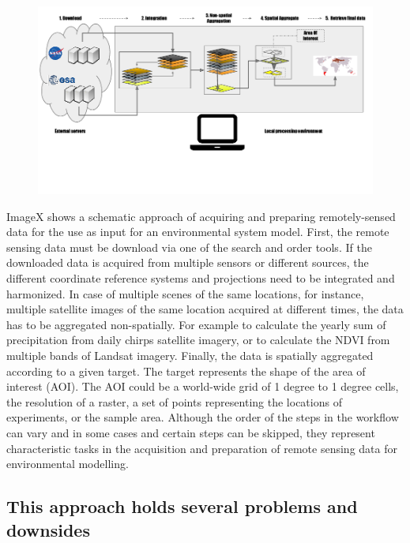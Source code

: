 \documentclass[11pt,twoside,a4paper,final]{report}
\begin{document}
\begin{center}

   \begin{figure}[h]
     \begin{center}
       \includegraphics[width=15cm]{images/traditional_acquisition.pdf}
    \end{center}
  \end{figure}
\end{center}

ImageX shows a schematic approach of acquiring and preparing remotely-sensed data for the use as input for an environmental system model.
First, the remote sensing data must be download via one of the search and order tools. If the downloaded data is acquired from multiple sensors or different sources, the different coordinate reference systems and projections need to be integrated and harmonized. In case of multiple scenes of the same locations, for instance, multiple satellite images of the same location acquired at different times, the data has to be aggregated non-spatially. For example to calculate the yearly sum of precipitation from daily chirps satellite imagery, or to calculate the NDVI from multiple bands of Landsat imagery.
Finally, the data is spatially aggregated according to a given target. The target represents the shape of the area of interest (AOI). The AOI could be a world-wide grid of 1 degree to 1 degree cells, the resolution of a raster, a set of points representing the locations of experiments, or the sample area.
Although the order of the steps in the workflow can vary and in some cases and certain steps can be skipped, they represent characteristic tasks in the acquisition and preparation of remote sensing data for environmental modelling.

\subsection{This approach holds several problems and downsides}
\end{document}
